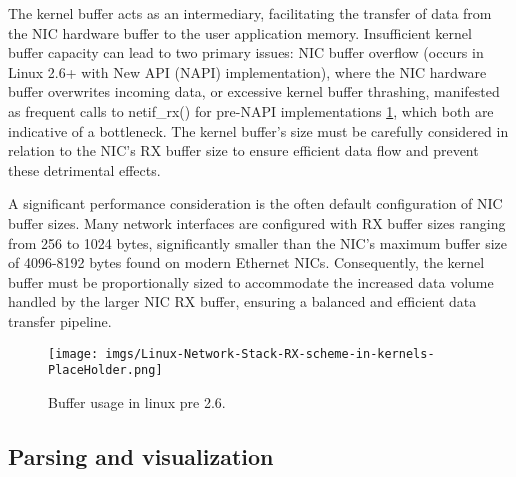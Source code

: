 The kernel buffer acts as an intermediary, facilitating the transfer of data from the NIC hardware buffer to the user application memory. Insufficient kernel buffer capacity can lead to two primary issues: NIC buffer overflow (occurs in Linux 2.6+ with New API (NAPI) implementation), where the NIC hardware buffer overwrites incoming data, or excessive kernel buffer thrashing, manifested as frequent calls to netif\_rx() for pre-NAPI implementations \ref*{fig:Network_Scheme_pre_2.6}, which both are indicative of a bottleneck.  The kernel buffer's size must be carefully considered in relation to the NIC's RX buffer size to ensure efficient data flow and prevent these detrimental effects.

A significant performance consideration is the often default configuration of NIC buffer sizes.  Many network interfaces are configured with RX buffer sizes ranging from 256 to 1024 bytes, significantly smaller than the NIC's maximum buffer size of 4096-8192 bytes found on modern Ethernet NICs. Consequently, the kernel buffer must be proportionally sized to accommodate the increased data volume handled by the larger NIC RX buffer, ensuring a balanced and efficient data transfer pipeline.

        \begin{figure}
            \centering
            \texttt{[image: imgs/Linux-Network-Stack-RX-scheme-in-kernels-PlaceHolder.png]}
            \caption{Buffer usage in linux pre 2.6.}
            \label{fig:Network_Scheme_pre_2.6}
        \end{figure}
        
\subsection{Parsing and visualization}


 

